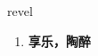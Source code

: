
\begin{frame}
{\huge revel}
\begin{center}
\begin{enumerate}\Large
  \item \textbf{享乐，陶醉}
\end{enumerate}
\end{center}
\end{frame}
